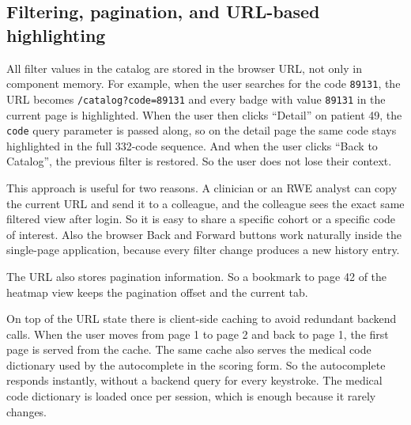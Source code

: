 \subsection{Filtering, pagination, and URL-based highlighting}
\label{sec:results-catalog-url}

All filter values in the catalog are stored in the browser URL, not only in component memory. For example, when the user searches for the code \texttt{89131}, the URL becomes \texttt{/catalog?code=89131} and every badge with value \texttt{89131} in the current page is highlighted. When the user then clicks ``Detail'' on patient 49, the \texttt{code} query parameter is passed along, so on the detail page the same code stays highlighted in the full 332-code sequence. And when the user clicks ``Back to Catalog'', the previous filter is restored. So the user does not lose their context.

This approach is useful for two reasons. A clinician or an RWE analyst can copy the current URL and send it to a colleague, and the colleague sees the exact same filtered view after login. So it is easy to share a specific cohort or a specific code of interest. Also the browser Back and Forward buttons work naturally inside the single-page application, because every filter change produces a new history entry.

The URL also stores pagination information. So a bookmark to page 42 of the heatmap view keeps the pagination offset and the current tab.

On top of the URL state there is client-side caching to avoid redundant backend calls. When the user moves from page 1 to page 2 and back to page 1, the first page is served from the cache. The same cache also serves the medical code dictionary used by the autocomplete in the scoring form. So the autocomplete responds instantly, without a backend query for every keystroke. The medical code dictionary is loaded once per session, which is enough because it rarely changes.